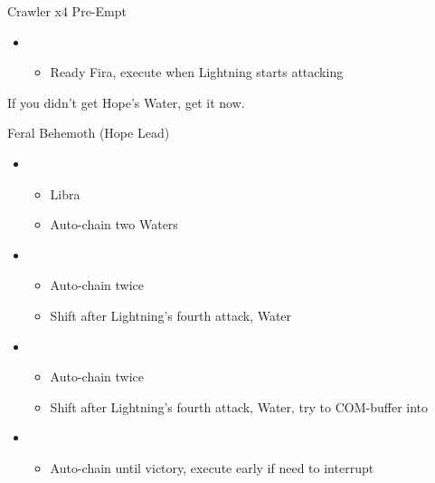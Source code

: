 \begin{multicols}{2}
\begin{battle}{Crawler x4 Pre-Empt}
\begin{itemize}
    \item \first
    \begin{itemize}
        \item Ready Fira, execute when Lightning starts attacking
    \end{itemize}
\end{itemize}
\end{battle}
If you didn't get Hope's Water, get it now.
\begin{battle}{Feral Behemoth (Hope Lead)}
\begin{itemize}
    \item \first
    \begin{itemize}
        \item Libra
        \item Auto-chain two Waters
    \end{itemize}
    \item \fourth
    \begin{itemize}
        \item Auto-chain twice
        \item Shift after Lightning's fourth attack, Water
    \end{itemize}
    \item \fifth
    \begin{itemize}
        \item Auto-chain twice
        \item Shift after Lightning's fourth attack, Water, try to COM-buffer into
    \end{itemize}
    \item \sixth
    \begin{itemize}
        \item Auto-chain until victory, execute early if need to interrupt
    \end{itemize}
\end{itemize}
\end{battle}


\end{multicols}
